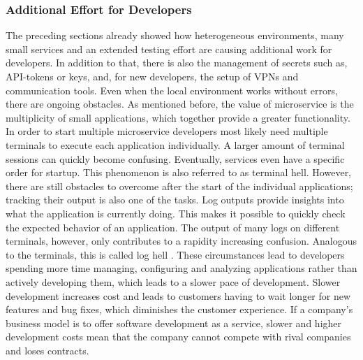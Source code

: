         \subsubsection{Additional Effort for Developers}
        The preceding sections already showed how heterogeneous environments, many small services and an extended testing effort are causing additional work for developers. In addition to that, there is also the management of secrets such as, \ac{API}-tokens or keys, and, for new developers, the setup of \ac{VPN}s and communication tools. Even when the local environment works without errors, there are ongoing obstacles. As mentioned before, the value of microservice is the multiplicity of small applications, which together provide a greater functionality. In order to start multiple microservice developers most likely need multiple terminals to execute each application individually. A larger amount of terminal sessions can quickly become confusing. Eventually, services even have a specific order for startup. This phenomenon is also referred to as terminal hell. However, there are still obstacles to overcome after the start of the individual applications; tracking their output is also one of the tasks. Log outputs provide insights into what the application is currently doing. This makes it possible to quickly check the expected behavior of an application. The output of many logs on different terminals, however, only contributes to a rapidity increasing confusion. Analogous to the terminals, this is called log hell \cite{micro}.\newline
        These circumstances lead to developers spending more time managing, configuring and analyzing applications rather than actively developing them, which leads to a slower pace of development. Slower development increases cost and leads to customers having to wait longer for new features and bug fixes, which diminishes the customer experience. If a company's business model is to offer software development as a service, slower and higher development costs mean that the company cannot compete with rival companies and loses contracts.

